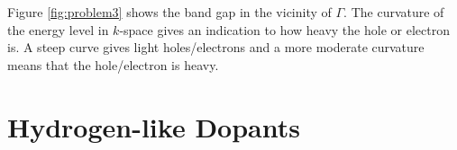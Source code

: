 \documentclass[11pt]{amsart}
\begin{document}
Figure \ref{fig:problem3} shows the band gap in the vicinity of $\Gamma$. The curvature of the energy level in $k$-space gives an indication to how heavy the hole or electron is. A steep curve gives light holes/electrons and a more moderate curvature means that the hole/electron is heavy.

\section{Hydrogen-like Dopants}
\end{document}
